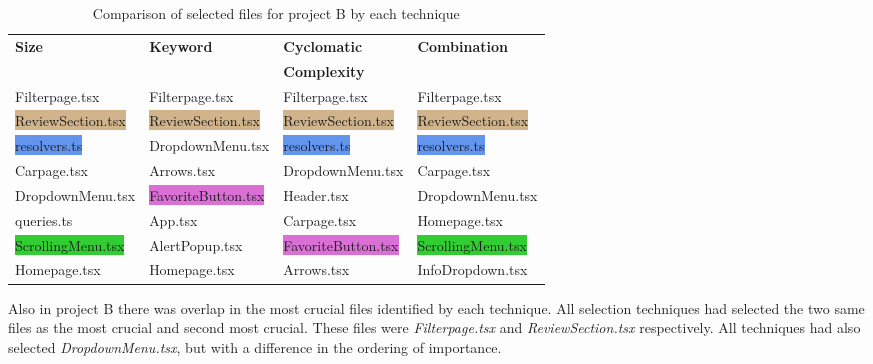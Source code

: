 \begin{table}[h!]
  \centering
  \fontsize{10}{10}\selectfont
  \caption{Comparison of selected files for project B by each technique}
  \label{tab:Selected_files_B}
  \begin{tabularx}{\textwidth}{llll}
    \hline
     \textbf{Size} & \textbf{Keyword} & \textbf{Cyclomatic } & \textbf{Combination} \\
     \textbf{} & \textbf{} & \textbf{Complexity } & \textbf{} \\ [1ex] \hline \hline 
    \colorbox{BurntOrange}{Filterpage.tsx} & \colorbox{BurntOrange}{Filterpage.tsx} & \colorbox{BurntOrange}{Filterpage.tsx} & \colorbox{BurntOrange}{Filterpage.tsx} \\ [2ex]
    \colorbox{Tan}{ReviewSection.tsx} & \colorbox{Tan}{ReviewSection.tsx} & \colorbox{Tan}{ReviewSection.tsx} & \colorbox{Tan}{ReviewSection.tsx} \\ [2ex]
    \colorbox{CornflowerBlue}{resolvers.ts} & \colorbox{PineGreen}{DropdownMenu.tsx} & \colorbox{CornflowerBlue}{resolvers.ts} & \colorbox{CornflowerBlue}{resolvers.ts} \\ [2ex]
    \colorbox{Rhodamine}{Carpage.tsx} & \colorbox{WildStrawberry}{Arrows.tsx} & \colorbox{PineGreen}{DropdownMenu.tsx} & \colorbox{Rhodamine}{Carpage.tsx} \\ [2ex] 
    \colorbox{PineGreen}{DropdownMenu.tsx} & \colorbox{Orchid}{FavoriteButton.tsx} & Header.tsx & \colorbox{PineGreen}{DropdownMenu.tsx} \\ [2ex] 
    queries.ts & App.tsx & \colorbox{Rhodamine}{Carpage.tsx} & \colorbox{Mulberry}{Homepage.tsx} \\ [2ex] 
    \colorbox{LimeGreen}{ScrollingMenu.tsx} & AlertPopup.tsx & \colorbox{Orchid}{FavoriteButton.tsx} & \colorbox{LimeGreen}{ScrollingMenu.tsx} \\ [2ex]
    \colorbox{Mulberry}{Homepage.tsx} & \colorbox{Mulberry}{Homepage.tsx} & \colorbox{WildStrawberry}{Arrows.tsx} & InfoDropdown.tsx \\ [2ex] 

  \end{tabularx}
\end{table}

Also in project B there was overlap in the most crucial files identified by each technique. All selection techniques had selected the two same files as the most crucial and second most crucial. These files were \textit{Filterpage.tsx} and \textit{ReviewSection.tsx} respectively. All techniques had also selected \textit{DropdownMenu.tsx}, but with a difference in the ordering of importance. \\


